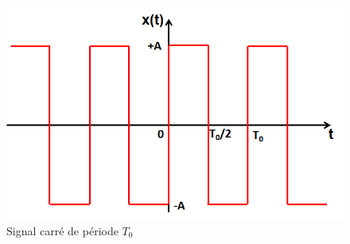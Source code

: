 	\begin{figure}[h!]
		\centering
		\includegraphics[scale=0.5]{images/signal_carre.png}
		\caption{Signal carré de période $T_{0}$}	
		\label{Fig:Signal_Carre} 
	\end{figure}
	

